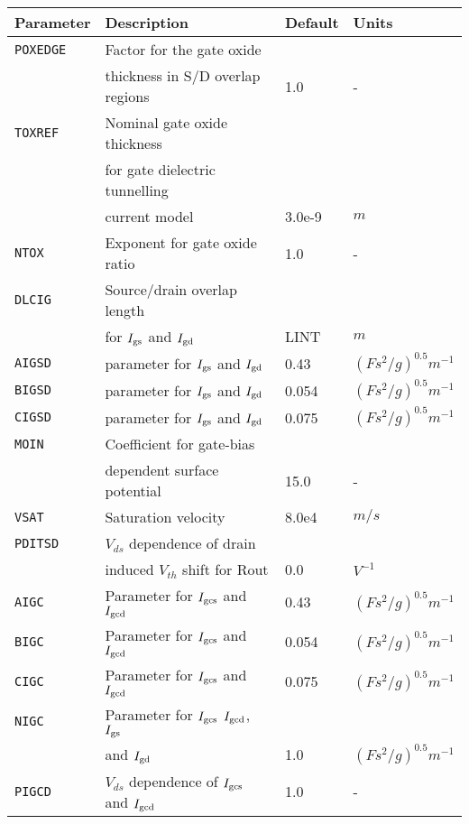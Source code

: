 \documentclass{article}
\begin{document}
\newpage
\begin{table}[H]
\begin{tabular}{|l| l| l| l|}
\hline
\textbf{Parameter} & \textbf{Description} & \textbf{Default} & \textbf{Units} \\
\hline
\texttt{POXEDGE} & Factor for the gate oxide & & \\
                 & thickness in S/D overlap regions & 1.0 & -\\
\texttt{TOXREF} & Nominal gate oxide thickness & & \\
                &for gate dielectric tunnelling & & \\
                &current model & 3.0e-9 & $m$\\
\texttt{NTOX} & Exponent for gate oxide ratio & 1.0 & -\\
\texttt{DLCIG} & Source/drain overlap length & & \\
               & for $I_{\rm{gs}}$ and $I_{\rm{gd}}$ & LINT & $m$\\
\texttt{AIGSD} & parameter for $I_{\rm{gs}}$ and $I_{\rm{gd}}$ & 0.43 & $(Fs^2/g)^{0.5} m^{-1}$\\
\texttt{BIGSD} & parameter for $I_{\rm{gs}}$ and $I_{\rm{gd}}$ & 0.054 & $(Fs^2/g)^{0.5} m^{-1}$\\
\texttt{CIGSD} & parameter for $I_{\rm{gs}}$ and $I_{\rm{gd}}$ & 0.075 & $(Fs^2/g)^{0.5} m^{-1}$\\
\texttt{MOIN} & Coefficient for gate-bias & & \\
              & dependent surface potential & 15.0 & - \\
\texttt{VSAT} & Saturation velocity & 8.0e4 & $m/s$\\
\texttt{PDITSD} & $V_{ds}$ dependence of drain & & \\
                & induced $V_{th}$ shift for Rout & 0.0 & $V^{-1}$\\
\texttt{AIGC} & Parameter for $I_{\rm{gcs}}$ and $I_{\rm{gcd}}$ & 0.43 & $(Fs^2/g)^{0.5} m^{-1}$\\
\texttt{BIGC} & Parameter for $I_{\rm{gcs}}$ and $I_{\rm{gcd}}$ & 0.054 & $(Fs^2/g)^{0.5} m^{-1}$\\
\texttt{CIGC} & Parameter for $I_{\rm{gcs}}$ and $I_{\rm{gcd}}$ & 0.075 & $(Fs^2/g)^{0.5} m^{-1}$\\
\texttt{NIGC} & Parameter for $I_{\rm{gcs}}$ $I_{\rm{gcd}}$, $I_{\rm{gs}}$ & & \\
              & and $I_{\rm{gd}}$ & 1.0 & $(Fs^2/g)^{0.5} m^{-1}$\\
\texttt{PIGCD} & $V_{ds}$ dependence of $I_{\rm{gcs}}$ and $I_{\rm{gcd}}$ & 1.0 & -\\

\end{tabular}
\end{table}
\end{document}
